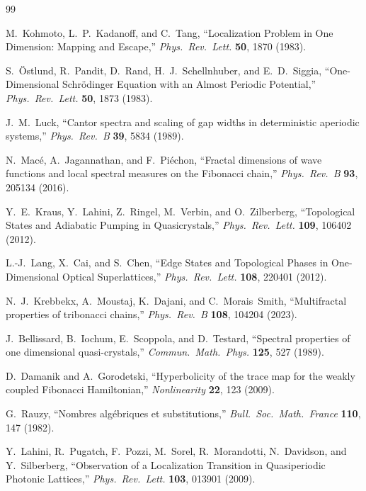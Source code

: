 \documentclass[12pt,a4paper]{article}
\begin{document}
\begin{thebibliography}{99}

M.~Kohmoto, L.~P.~Kadanoff, and C.~Tang,
``Localization Problem in One Dimension: Mapping and Escape,''
\textit{Phys.\ Rev.\ Lett.} \textbf{50}, 1870 (1983).

S.~\"{O}stlund, R.~Pandit, D.~Rand, H.~J.~Schellnhuber, and E.~D.~Siggia,
``One-Dimensional Schr\"{o}dinger Equation with an Almost Periodic Potential,''
\textit{Phys.\ Rev.\ Lett.} \textbf{50}, 1873 (1983).

J.~M.~Luck,
``Cantor spectra and scaling of gap widths in deterministic aperiodic systems,''
\textit{Phys.\ Rev.\ B} \textbf{39}, 5834 (1989).

N.~Mac\'{e}, A.~Jagannathan, and F.~Pi\'{e}chon,
``Fractal dimensions of wave functions and local spectral measures
on the Fibonacci chain,''
\textit{Phys.\ Rev.\ B} \textbf{93}, 205134 (2016).

Y.~E.~Kraus, Y.~Lahini, Z.~Ringel, M.~Verbin, and O.~Zilberberg,
``Topological States and Adiabatic Pumping in Quasicrystals,''
\textit{Phys.\ Rev.\ Lett.} \textbf{109}, 106402 (2012).

L.-J.~Lang, X.~Cai, and S.~Chen,
``Edge States and Topological Phases in One-Dimensional Optical Superlattices,''
\textit{Phys.\ Rev.\ Lett.} \textbf{108}, 220401 (2012).

N.~J.~Krebbekx, A.~Moustaj, K.~Dajani, and C.~Morais~Smith,
``Multifractal properties of tribonacci chains,''
\textit{Phys.\ Rev.\ B} \textbf{108}, 104204 (2023).

J.~Bellissard, B.~Iochum, E.~Scoppola, and D.~Testard,
``Spectral properties of one dimensional quasi-crystals,''
\textit{Commun.\ Math.\ Phys.} \textbf{125}, 527 (1989).

D.~Damanik and A.~Gorodetski,
``Hyperbolicity of the trace map for the weakly coupled Fibonacci Hamiltonian,''
\textit{Nonlinearity} \textbf{22}, 123 (2009).

G.~Rauzy,
``Nombres alg\'{e}briques et substitutions,''
\textit{Bull.\ Soc.\ Math.\ France} \textbf{110}, 147 (1982).

Y.~Lahini, R.~Pugatch, F.~Pozzi, M.~Sorel, R.~Morandotti, N.~Davidson,
and Y.~Silberberg,
``Observation of a Localization Transition in Quasiperiodic Photonic Lattices,''
\textit{Phys.\ Rev.\ Lett.} \textbf{103}, 013901 (2009).


\end{thebibliography}
\end{document}
